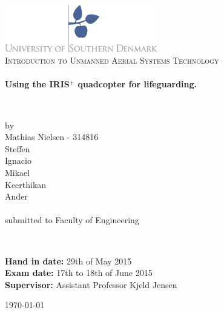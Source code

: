 \begin{titlepage}
\begin{center}

\includegraphics[width=0.5\textwidth]{./Images/logo.jpg}~\\[2cm]


\textsc{\Large Introduction to Unmanned Aerial Systems Technology}\\[1.5cm]

\HRule \\[0.4cm]
{ \huge \bfseries Using the IRIS$^{+}$ quadcopter for lifeguarding.  \\[0.4cm] }

\HRule \\[1.5cm]


\begin{center}
\begin{minipage}{0.5\textwidth} 
\large 
\center
 by\\
\LARGE
Mathias Nielsen - 314816\\
\LARGE
Steffen\\ 
\LARGE
Ignacio\\
\LARGE
Mikael \\
\LARGE
Keerthikan \\ 
\LARGE
Ander \\
\large
~\\
submitted to Faculty of Engineering

\end{minipage}
\end{center}

~\\[3cm]

\begin{flushleft}
\begin{minipage}{1\textwidth}
\large

\textbf{Hand in date:} 29th of May 2015\\[0.3cm]
\textbf{Exam date:} 17th to 18th of June 2015\\[0.3cm]
\textbf{Supervisor:} Assistant Professor Kjeld Jensen\\

\end{minipage}

\end{flushleft}

\vfill

{\large \today}
\end{center}
\end{titlepage}